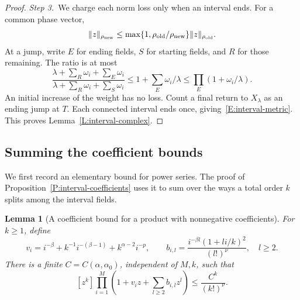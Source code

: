 \documentclass[12pt,oneside,openany]{book}
\makeatletter
\let\lean@pending\@empty
\newcommand{\LeanMarker}[1]{\gdef\lean@pending{#1}}
\numberwithin{equation}{section}
\newtheorem{lemma}[theorem]{Lemma}
\theoremstyle{nogostyle}
\theoremstyle{definition}
\makeatother
\begin{document}
\begin{proof}
  \medskip
  \noindent\textit{Step 3.~}We charge each norm loss only when an interval
  ends.
  For a common phase vector,
  \[
    \|z\|_{\rho_{\rm new}}
    \le\max\{1,\rho_{\rm old}/\rho_{\rm new}\}\|z\|_{\rho_{\rm old}}.
  \]
  At a jump, write $E$ for ending fields, $S$ for starting fields, and $R$ for
  those remaining. The ratio is at most
  \[
    \frac{\lambda+\sum_R\omega_i+\sum_E\omega_i}
    {\lambda+\sum_R\omega_i+\sum_S\omega_i}
    \le1+\sum_E\omega_i/\lambda
    \le\prod_E(1+\omega_i/\lambda).
  \]
  An initial increase of the weight has no loss. Count a final return to
  $X_\lambda$ as an ending jump at $T$. Each connected interval ends once,
  giving~\eqref{E:interval-metric}. This proves Lemma~\ref{L:interval-complex}.
\end{proof}

\subsection{Summing the coefficient bounds}

We first record an elementary bound for power series. The proof of
Proposition~\ref{P:interval-coefficients} uses it to sum over the ways a total
order $k$ splits among the interval fields.

\LeanMarker{L:inventory-product}
\begin{lemma}[A coefficient bound for a product with nonnegative coefficients]\label{L:inventory-product}
  For $k \ge 1$, define
  \[
    v_i=i^{-\beta}+k^{-1}i^{-(\beta-1)}
    +k^{\alpha-2}i^{-p},\qquad
    b_{i,l}=\frac{i^{-\beta l}(1+li/k)^2}{(l!)^\nu},\quad l\ge2.
  \]
  There is a finite $C = C(\alpha,\alpha_0)$, independent of $M,k$, such that
  \begin{equation}\label{E:inventory-product}
    [z^k]\prod_{i=1}^M\left(1+v_i z+\sum_{l\ge2}b_{i,l}z^l\right)
    \le\frac{C^k}{(k!)^\nu}.
  \end{equation}
\end{lemma}
\end{document}
